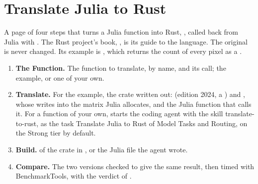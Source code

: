 \section{Translate Julia to Rust}\label{sec:rust}
A page of four steps that turns a Julia function into Rust, , called back
from Julia with . The Rust project's book, , is its guide to
the language. The original
is never changed. Its example is , which returns the count of every pixel as a
.
\begin{enumerate}
  \item \textbf{The Function.} The function to translate, by name, and its call; the example, or one of your own.
  \item \textbf{Translate.} For the example, the crate written out:  (edition 2024, a
    ) and , whose  writes into the matrix Julia allocates, and the Julia
    function  that calls it. For a function of your own,  starts the
    coding agent with the skill translate-to-rust, as the task Translate Julia to Rust of Model Tasks and Routing, on
    the Strong tier by default.
  \item \textbf{Build.}  of the crate in , or the Julia file the agent wrote.
  \item \textbf{Compare.} The two versions checked to give the same result, then timed with BenchmarkTools, with the
    verdict of .
\end{enumerate}


